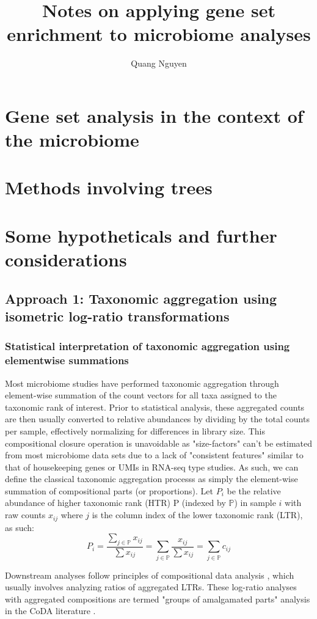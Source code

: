\documentclass{article}
\title{Notes on applying gene set enrichment to microbiome analyses}
\author{Quang Nguyen}
\begin{document}
\maketitle

\section{Gene set analysis in the context of the microbiome}
\section{Methods involving trees}
\section{Some hypotheticals and further considerations}
\subsection{Approach 1: Taxonomic aggregation using isometric log-ratio transformations}
\subsubsection{Statistical interpretation of taxonomic aggregation using elementwise summations}

\indent Most microbiome studies have performed taxonomic aggregation through element-wise summation of the count vectors for all taxa assigned to the taxonomic rank of interest. Prior to statistical analysis, these aggregated counts are then usually converted to relative abundances by dividing by the total counts per sample, effectively normalizing for differences in library size. This compositional closure operation is unavoidable as "size-factors" can't be estimated from most microbiome data sets due to a lack of "consistent features" similar to that of housekeeping genes or UMIs in RNA-seq type studies. As such, we can define the classical taxonomic aggregation processs as simply the element-wise summation of compositional parts (or proportions). Let $P_{i}$ be the relative abundance of higher taxonomic rank (HTR) P (indexed by $\mathbb{P}$) in sample $i$ with raw counts $x_{ij}$ where $j$ is the column index of the lower taxonomic rank (LTR), as such:
$$P_{i} =\frac{\sum_{j \in \mathbb{P}} x_{ij}}{\sum x_{ij}} = \sum_{j \in \mathbb{P}} \frac{x_{ij}}{\sum x_{ij}} = \sum_{j \in \mathbb{P}} c_{ij}$$

\noindent Downstream analyses follow principles of compositional data analysis \cite{gloor2017}, which usually involves analyzing ratios of aggregated LTRs. These log-ratio analyses with aggregated compositions are termed "groups of amalgamated parts" analysis in the CoDA literature \cite{egozcue2005}. 
\end{document}
